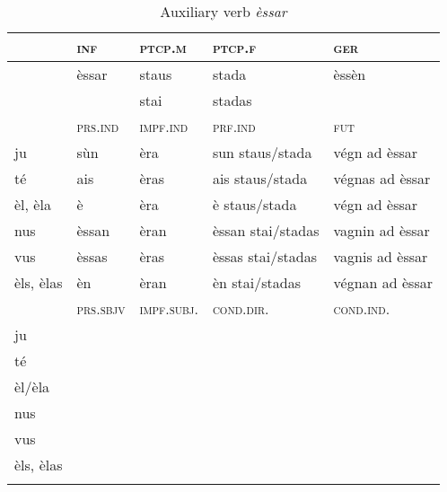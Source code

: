 \begin{table}
\caption{Auxiliary verb \textit{èssar}}
\label{tab:aux:èssar}
 \begin{tabular}{lllll}
 
  \lsptoprule
 & \textsc{inf}  & \textsc{ptcp.m}  & \textsc{ptcp.f}  &  \textsc{ger}\\
  \midrule
  &èssar &staus & stada & èssèn\\
  &&stai &stadas\\
   
  \lsptoprule
    &\textsc{prs.ind}  &\textsc{impf.ind} & \textsc{prf.ind} & \textsc{fut}\\
   \midrule
ju &sùn & èra &sun staus/stada &végn ad èssar\\
té &ais &èras &ais staus/stada & végnas ad èssar\\
èl, èla &è & èra &è staus/stada &végn ad èssar\\
nus &èssan &èran &èssan stai/stadas &vagnin ad èssar\\
vus &èssas & èras &èssas stai/stadas &vagnis ad èssar\\
èls, èlas& èn & èran &èn stai/stadas &végnan ad èssar\\

 \lsptoprule
   &\textsc{prs.sbjv} & \textsc{impf.subj.}  &\textsc{cond.dir.} & \textsc{cond.ind.}\\
\midrule
ju& &&& \\
té\\
èl/èla\\
nus\\
vus\\
èls, èlas\\
  \lspbottomrule
 \end{tabular}
\end{table}


